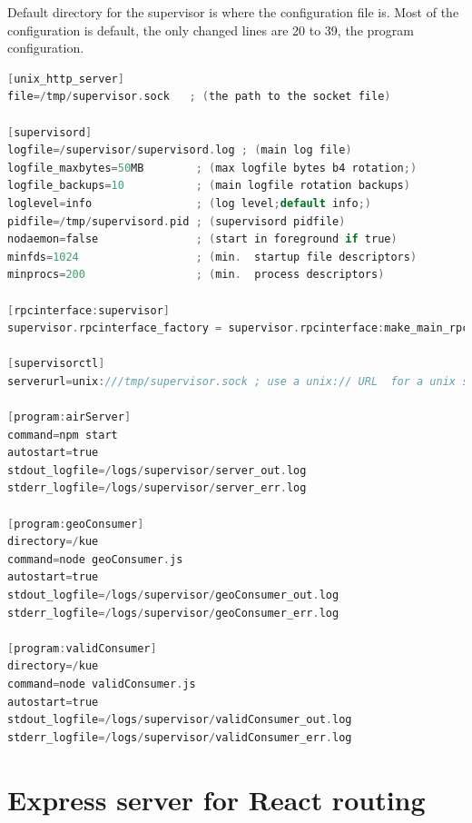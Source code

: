 \documentclass[thesis=M,english]{FITthesis}[2012/10/20]
\begin{document}
Default directory for the supervisor is where the configuration file is. Most of the configuration is default, the only changed lines are 20 to 39, the program configuration.
\begin{lstlisting}[language=C]
[unix_http_server]
file=/tmp/supervisor.sock   ; (the path to the socket file)

[supervisord]
logfile=/supervisor/supervisord.log ; (main log file)
logfile_maxbytes=50MB        ; (max logfile bytes b4 rotation;)
logfile_backups=10           ; (main logfile rotation backups)
loglevel=info                ; (log level;default info;)
pidfile=/tmp/supervisord.pid ; (supervisord pidfile)
nodaemon=false               ; (start in foreground if true)
minfds=1024                  ; (min.  startup file descriptors)
minprocs=200                 ; (min.  process descriptors)

[rpcinterface:supervisor]
supervisor.rpcinterface_factory = supervisor.rpcinterface:make_main_rpcinterface

[supervisorctl]
serverurl=unix:///tmp/supervisor.sock ; use a unix:// URL  for a unix socket

[program:airServer]
command=npm start
autostart=true 
stdout_logfile=/logs/supervisor/server_out.log
stderr_logfile=/logs/supervisor/server_err.log  

[program:geoConsumer]
directory=/kue
command=node geoConsumer.js
autostart=true 
stdout_logfile=/logs/supervisor/geoConsumer_out.log
stderr_logfile=/logs/supervisor/geoConsumer_err.log  

[program:validConsumer]
directory=/kue
command=node validConsumer.js
autostart=true 
stdout_logfile=/logs/supervisor/validConsumer_out.log
stderr_logfile=/logs/supervisor/validConsumer_err.log  

\end{lstlisting}

\chapter{Express server for React routing}
\label{apx:react-server}
\end{document}
